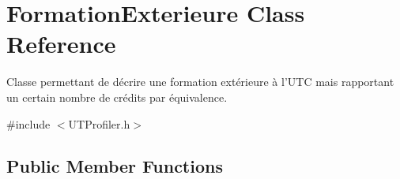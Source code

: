 \hypertarget{class_formation_exterieure}{\section{Formation\-Exterieure Class Reference}
\label{class_formation_exterieure}
}


Classe permettant de décrire une formation extérieure à l'U\-T\-C mais rapportant un certain nombre de crédits par équivalence.  




{\ttfamily \#include $<$U\-T\-Profiler.\-h$>$}

\subsection*{Public Member Functions}
